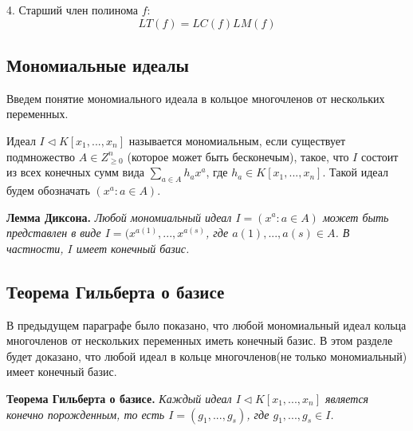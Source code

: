4. Старший член полинома $f$:
$$ LT(f) = LC(f)LM(f) $$ 

\subsection{Мономиальные идеалы}

Введем понятие мономиального идеала в кольцое многочленов от нескольких переменных.

Идеал $I \triangleleft K \left[ x_{1}, ... , x_{n} \right]$ называется мономиальным, если существует подмножество $A \in Z_{\geq0}^{n}$ (которое может быть бесконечым), такое, что $I$ состоит из всех конечных сумм вида $\sum_{a \in A}h_{a}x^{a}$, где $h_{a} \in  K \left[ x_{1}, ... , x_{n} \right]$. Такой идеал будем обозначать $(x^{a}: a \in A)$.

\textbf{Лемма Диксона.} {
\it 
Любой мономиальный идеал $ I = ( x^{a} : a \in A)$ может быть представлен в виде $ I = (x^{a(1)}, ... , x^{a(s)}$, где $a(1), ..., a(s) \in A$. В частности, $I$ имеет конечный базис.
}

\subsection{Теорема Гильберта о базисе}
В предыдущем параграфе было  показано, что любой мономиальный идеал кольца многочленов от нескольких переменных иметь конечный базис. В этом разделе будет доказано, что любой идеал в кольце многочленов(не только мономиальный) имеет конечный базис.

\textbf{Теорема Гильберта о базисе.}{
\it
Каждый идеал $I \triangleleft K \left[ x_{1}, ... , x_{n} \right]$ является конечно порожденным, то есть $I = (g_{1}, ..., g_{s})$, где $g_{1}, ..., g_{s} \in I$.
}

